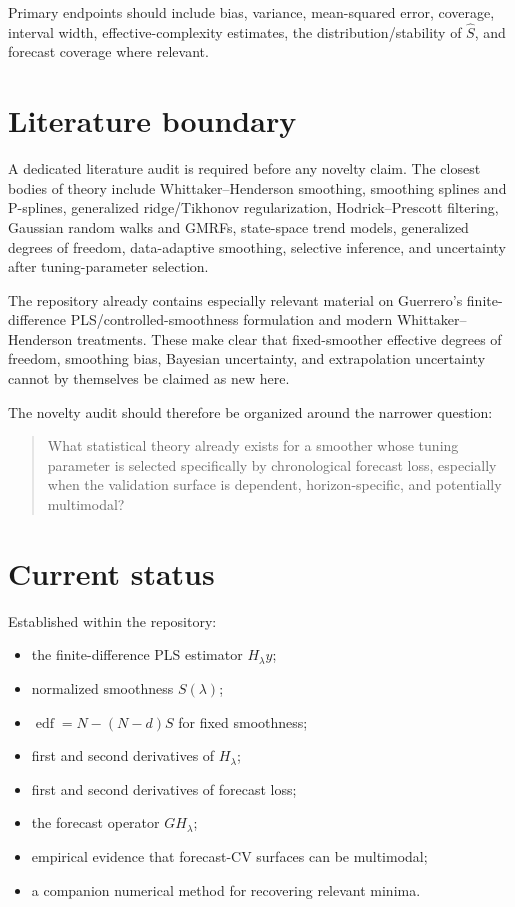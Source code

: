 \documentclass[11pt]{article}
\begin{document}
Primary endpoints should include bias, variance, mean-squared error, coverage,
interval width, effective-complexity estimates, the distribution/stability of
\(\widehat S\), and forecast coverage where relevant.

\section{Literature boundary}

A dedicated literature audit is required before any novelty claim. The closest
bodies of theory include Whittaker--Henderson smoothing, smoothing splines and
P-splines, generalized ridge/Tikhonov regularization, Hodrick--Prescott
filtering, Gaussian random walks and GMRFs, state-space trend models,
generalized degrees of freedom, data-adaptive smoothing, selective inference,
and uncertainty after tuning-parameter selection.

The repository already contains especially relevant material on Guerrero's
finite-difference PLS/controlled-smoothness formulation and modern
Whittaker--Henderson treatments. These make clear that fixed-smoother effective
degrees of freedom, smoothing bias, Bayesian uncertainty, and extrapolation
uncertainty cannot by themselves be claimed as new here.

The novelty audit should therefore be organized around the narrower question:
\begin{quote}
What statistical theory already exists for a smoother whose tuning parameter is
selected specifically by chronological forecast loss, especially when the
validation surface is dependent, horizon-specific, and potentially multimodal?
\end{quote}

\section{Current status}

Established within the repository:
\begin{itemize}
\item the finite-difference PLS estimator \(H_\lambda y\);
\item normalized smoothness \(S(\lambda)\);
\item \(\operatorname{edf}=N-(N-d)S\) for fixed smoothness;
\item first and second derivatives of \(H_\lambda\);
\item first and second derivatives of forecast loss;
\item the forecast operator \(GH_\lambda\);
\item empirical evidence that forecast-CV surfaces can be multimodal;
\item a companion numerical method for recovering relevant minima.
\end{itemize}
\end{document}
